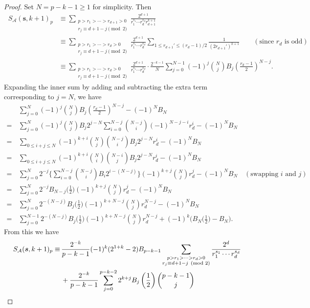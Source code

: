 \documentclass{article}
\newcommand{\bfs}{{\boldsymbol{\sl{s}}}}
\newcommand{\calA}{\mathcal{A}}
\theoremstyle{plain}
\theoremstyle{definition}
\begin{document}
\begin{proof}
Set $N=p-k-1\ge 1$ for simplicity. Then
\begin{align*}
\ S_\calA(\mathbf s,k+1)_p&
\equiv\sum_{\substack{p>r_1>\cdots >r_{d+1}>0 \\ r_{j}\equiv d+1-j\pmod 2}} \frac{2^{d+1}}{r_1^{s_1}\cdots r_{d}^{s_d}r_{d+1}^{k+1}} \\
&\equiv\sum_{\substack{p>r_1>\cdots >r_{d}>0\\r_j\equiv d+1-j\pmod 2}} \frac{2^{d+1}}{r_1^{s_1}\cdots r_{d}^{s_d}}\sum_{1\le r_{d+1}'\le (r_{d}-1)/2}\frac{1}{(2r_{d+1}')^{k+1}} \qquad(\text{since $r_{d}$ is odd}) \\
&\equiv\sum_{\substack{p>r_1>\cdots >r_{d}>0\\r_j\equiv d+1-j\pmod 2}} \frac{2^{d+1}}{r_1^{s_1}\cdots r_{d}^{s_d}} \cdot\frac{2^{-k-1}}{N}\sum_{j=0}^{N-1}(-1)^j\binom{N}{j}B_j\left(\frac{r_{d}-1}{2}\right)^{N-j}.
\end{align*}
Expanding the inner sum by adding and subtracting the extra term corresponding to $j=N$, we have
\begin{align*}
&\,\sum_{j=0}^{N}(-1)^j\binom{N}{j}B_j\left(\frac{r_{d}-1}{2}\right)^{N-j}-(-1)^N B_N\\
=&\,
\sum_{j=0}^{N}(-1)^j\binom{N}{j}B_j2^{j-N}\sum_{i=0}^{N-j}\binom{N-j}{i}(-1)^{N-j-i}r_{d}^{i}-(-1)^N B_N\\
=&\, \sum_{0\le i+j\le N} (-1)^{k+i}\binom{N}{j}\binom{N-j}{i}B_j2^{j-N}r_{d}^{i} -(-1)^N B_N\\
=&\, \sum_{0\le i+j\le N} (-1)^{k+i}\binom{N}{i}\binom{N-i}{j}B_j2^{j-N}r_{d}^{i} -(-1)^N B_N\\
=&\, \sum_{j=0}^{N}2^{-j}\Bigg\{\sum_{i=0}^{N-j}\binom{N-j}{i}B_i2^{i-(N-j)}\Bigg\}(-1)^{k+j}\binom{N}{j}r_{d}^{j}-(-1)^N B_N \quad(\text{swapping $i$ and $j$})\\
=&\, \sum_{j=0}^{N}2^{-j}B_{N-j}\Big(\frac12\Big)(-1)^{k+j}\binom{N}{j}r_{d}^{j}-(-1)^N B_N\\
=&\, \sum_{j=0}^{N}2^{-(N-j)}B_{j}\Big(\frac12\Big)(-1)^{k+N-j}\binom{N}{j}r_{d}^{N-j}-(-1)^N B_N \\
=&\, \sum_{j=0}^{N-1}2^{-(N-j)}B_{j}\Big(\frac12\Big)(-1)^{k+N-j}\binom{N}{j}r_{d}^{N-j}
+(-1)^k\Big(B_{N}\Big(\frac12\Big)- B_N\Big) .
\end{align*}
From this we have
\begin{align*}
S_\calA(\bfs,k+1)_p\equiv&\,
\frac{2^{-k}}{p-k-1}(-1)^k(2^{1+k}-2)B_{p-k-1}\sum_{\substack{p>r_1>\cdots >r_{d}>0\\r_j\equiv d+1-j\pmod 2}}\frac{2^{d}}{r_1^{s_1}\cdots r_d^{s_{d}}} \\ &\,+\frac{2^{-k}}{p-k-1}\sum_{j=0}^{p-k-2}2^{k+j}B_j\left(\frac12\right)\binom{p-k-1}{j}

\end{align*}
\end{proof}
\end{document}
